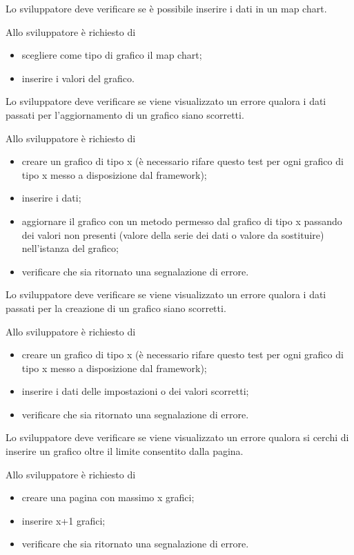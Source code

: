 	Lo sviluppatore deve verificare se è possibile inserire i dati in un map chart.

		Allo sviluppatore è richiesto di
		\begin{itemize}
			\item scegliere come tipo di grafico il map chart;
			\item inserire i valori del grafico.
		\end{itemize}

	Lo sviluppatore deve verificare se viene visualizzato un errore qualora i dati passati per l'aggiornamento di un grafico siano scorretti.

		Allo sviluppatore è richiesto di
		\begin{itemize}
			\item creare un grafico di tipo x (è necessario rifare questo test per ogni grafico di tipo x messo a disposizione dal framework);
			\item inserire i dati;
			\item aggiornare il grafico con un metodo permesso dal grafico  di tipo x passando dei valori non presenti (valore della serie dei dati o valore da sostituire) nell'istanza del grafico;
			\item verificare che sia ritornato una segnalazione di errore.
		\end{itemize}

	Lo sviluppatore deve verificare se viene visualizzato un errore qualora i dati passati per la creazione di un grafico siano scorretti.

		Allo sviluppatore è richiesto di
		\begin{itemize}
			\item creare un grafico di tipo x (è necessario rifare questo test per ogni grafico di tipo x messo a disposizione dal framework);
			\item inserire i dati delle impostazioni o dei valori scorretti;
			\item verificare che sia ritornato una segnalazione di errore.
		\end{itemize}

	Lo sviluppatore deve verificare se viene visualizzato un errore qualora si cerchi di inserire un grafico oltre il limite consentito dalla pagina.

		Allo sviluppatore è richiesto di
		\begin{itemize}
			\item creare una pagina con massimo x grafici;
			\item inserire x+1 grafici;
			\item verificare che sia ritornato una segnalazione di errore.
		\end{itemize}

